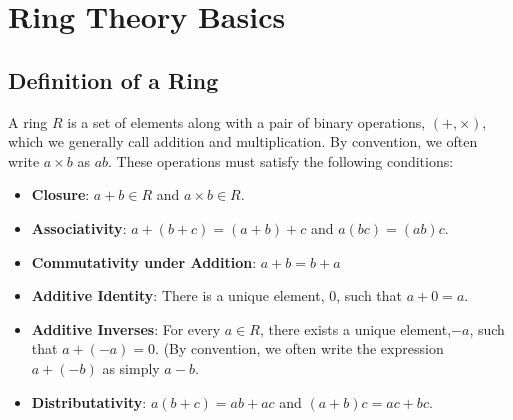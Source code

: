 \documentclass[twoside]{report}
\begin{document}


\newcommand{\poly}[1]{#1[x]}
\newcommand{\polyn}[1]{#1[x_1, x_2,\cdots,x_n]}
\newcommand{\polyny}[1]{#1[x_1, x_2,\cdots,x_n, y]}
\newcommand{\ideal}[1]{\langle#1\rangle}
\newcommand{\varideal}[1]{\mathcal{I}(#1)}
\newcommand{\variety}[1]{\mathbf{V}(#1)}

\addtocounter{chapter}{1}

\section{Ring Theory Basics}

\setlength{\parindent}{0pt}

\subsection{Definition of a Ring}

A ring $R$ is a set of elements along with a pair of binary
operations, $(+, \times)$, which we generally call addition and
multiplication.  By convention, we often write $a \times b$ as $ab$.
These operations must satisfy the following conditions:

\begin{itemize}
\item \textbf{Closure}: $a+b \in R$ and $a \times b \in R$.
\item \textbf{Associativity}: $a+(b+c)=(a+b)+c$ and $a(bc) = (ab)c$.
\item \textbf{Commutativity under Addition}: $a+b = b+a$
\item \textbf{Additive Identity}: There is a unique element, $0$, such that $a+0=a$.
\item \textbf{Additive Inverses}: For every $a \in R$, there exists a
  unique element,$-a$, such that $a + (-a) = 0$. (By convention, we
  often write the expression $a + (-b)$ as simply $a-b$.
\item \textbf{Distributativity}: $a(b+c) = ab + ac$ and $(a+b)c = ac
  + bc$.
\end{itemize}
\end{document}

